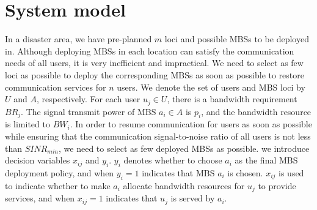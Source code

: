 \documentclass[11pt,a4paper]{article}
\begin{document}
\section{System model}
In a disaster area, we have pre-planned $m$ loci and possible MBSs to be deployed in. Although deploying MBSs in each location can satisfy the communication needs of all users, it is very inefficient and impractical. We need to select as few loci as possible to deploy the corresponding MBSs as soon as possible to restore communication services for $n$ users. We denote the set of users and MBS loci by $U$ and $A$, respectively. For each user $u_j \in U$, there is a bandwidth requirement $BR_j$. The signal transmit power of MBS $a_i \in A$ is $p_i$, and the bandwidth resource is limited to $BW_i$. 
In order to resume communication for users as soon as possible while ensuring that the communication signal-to-noise ratio of all users is not less than $SINR_{min}$, we need to select as few deployed MBSs as possible. we introduce decision variables $x_{ij}$ and $y_i$. $y_i$ denotes whether to choose $a_i$ as the final MBS deployment policy, and when $y_i=1$ indicates that MBS $a_i$ is chosen. $x_{ij}$ is used to indicate whether to make $a_i$ allocate bandwidth resources for $u_j$ to provide services, and when $x_{ij}=1$ indicates that $u_j$ is served by $a_i$.
\end{document}
